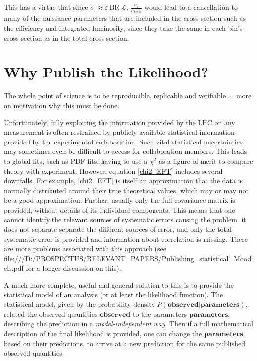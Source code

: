 This has a virtue that since $\sigma \ \approx \varepsilon \ \text{BR} \ \mathcal{L}$, $\frac{\sigma_i}{\sigma_\text{total}}$ would lead to a cancellation to many of the nuissance parameters that are included in the cross section such as the efficiency and integrated luminosity, since they take the same in each bin's cross section as in the total cross section. 









\section{Why Publish the Likelihood?}

The whole point of science is to be reproducible, replicable and verifiable ...  more on motivation why this must be done.

Unfortunately, fully exploiting the information provided by the LHC on any measurement is often restrained by publicly available statistical information provided by the experimental collaboration. Such vital statistical uncertainties may sometimes even be difficult to access for collaboration members. This leads to global fits, such as PDF fits, having to use a $\chi^2$ as a figure of merit to compare theory with experiment. However, equation \ref{chi2_EFT} includes several downfalls. For example, \ref{chi2_EFT} is itself an approximation that the data is normally distributed around their true theoretical values, which may or may not be a good approximation. Further, usually only the full covariance matrix is provided, without details of its individual components. This means that one cannot identify the relevant sources of systematic errors causing the problem. it does not separate separate the different sources of error, and only the total systematic error is provided and information about correlation is missing. There are more problems associated with this approach (see file:///D:/PROSPECTUS/RELEVANT_PAPERS/Publishing_statistical_Moodels.pdf for a longer discussion on this).

A much more complete, useful and general solution to this is to provide the statistical model of an analysis (or at least the likelihood function). The statistical model, given by the probability density $P(\textbf{observed} | \textbf{parameters})$, related the observed quantities $\textbf{observed}$ to the parameters $\textbf{parameters}$, describing the prediction in a \emph{model-independent way}. Then if a full mathematical description of the final likelihood is provided, one can change the \textbf{parameters} based on their predictions, to arrive at a new prediction for the same published observed quantities.






